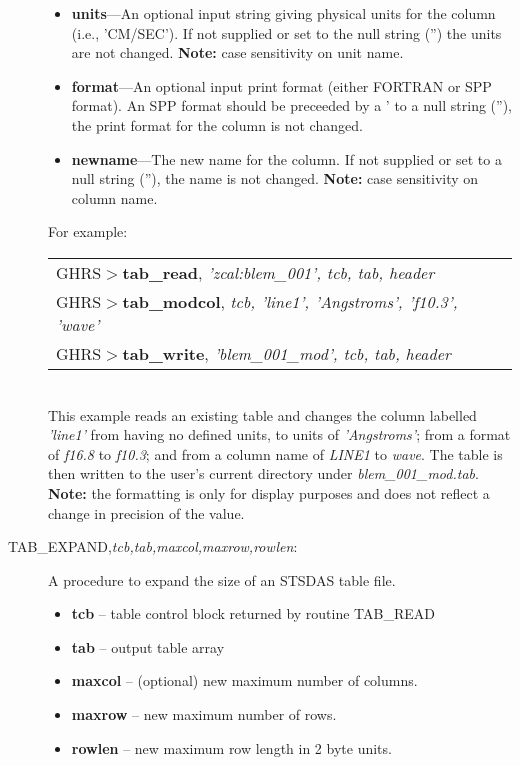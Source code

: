 \begin{description}
\begin{itemize}
\item {\bf units}---An optional input string giving physical units for the 
column (i.e., 'CM/SEC').  If not supplied or set to the null string ('') 
the units are not changed.  {\bf Note:} case sensitivity on unit name.

\item {\bf format}---An optional input print format (either FORTRAN or SPP 
format). An SPP format should be preceeded by a '%
to a null string (''), the print format for the column is not changed.

\item {\bf newname}---The new name for the column.  If not supplied
or set to a null string (''), the name is not changed. {\bf Note:}
case sensitivity on column name.

\end{itemize}

\noindent
For example:\\

\begin{tabular}{ll}
GHRS$>${\bf tab\_read}, {\it 'zcal:blem\_001', tcb, tab, header} & \\
GHRS$>${\bf tab\_modcol}, {\it tcb, 'line1', 'Angstroms', 'f10.3', 'wave'} & \\
GHRS$>${\bf tab\_write}, {\it 'blem\_001\_mod', tcb, tab, header} & \\
\end{tabular}\\

\noindent
This example 
reads an existing table and changes the column labelled 
{\it 'line1'} from having no defined units, to units of {\it 'Angstroms'}; 
from a format of {\it f16.8} to {\it f10.3}; and from a column name of {\it LINE1} 
to {\it wave}.  The table is then written to the user's current directory 
under {\it blem\_001\_mod.tab}.  {\bf Note:} the formatting is only for 
display purposes and does not reflect a change in precision of the value.
%
\item [	TAB\_EXPAND,{\it tcb,tab,maxcol,maxrow,rowlen}:]

A procedure to expand the size of an STSDAS table file.

\begin{itemize}
\item	{\bf tcb} -- table control block returned by routine TAB\_READ
\item	{\bf tab} -- output table array
\item	{\bf maxcol} -- (optional) new maximum number of columns.
\item	{\bf maxrow} -- new maximum number of rows.
\item	{\bf rowlen} -- new maximum row length in 2 byte units.
 \end{itemize}


\end{description}
